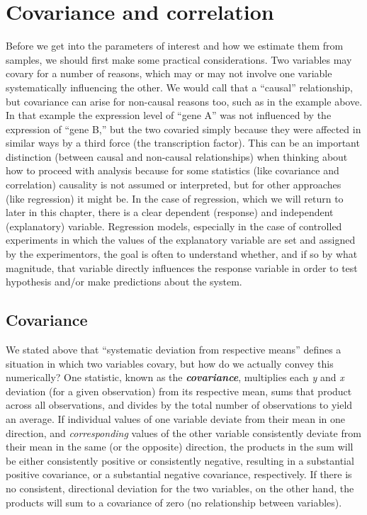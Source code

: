 \documentclass[]{book}
\begin{document}
\hypertarget{covariance-and-correlation}{%
\section{Covariance and correlation}\label{covariance-and-correlation}}

Before we get into the parameters of interest and how we estimate them from samples, we should first make some practical considerations. Two variables may covary for a number of reasons, which may or may not involve one variable systematically influencing the other. We would call that a ``causal'' relationship, but covariance can arise for non-causal reasons too, such as in the example above. In that example the expression level of ``gene A'' was not influenced by the expression of ``gene B,'' but the two covaried simply because they were affected in similar ways by a third force (the transcription factor). This can be an important distinction (between causal and non-causal relationships) when thinking about how to proceed with analysis because for some statistics (like covariance and correlation) causality is not assumed or interpreted, but for other approaches (like regression) it might be. In the case of regression, which we will return to later in this chapter, there is a clear dependent (response) and independent (explanatory) variable. Regression models, especially in the case of controlled experiments in which the values of the explanatory variable are set and assigned by the experimentors, the goal is often to understand whether, and if so by what magnitude, that variable directly influences the response variable in order to test hypothesis and/or make predictions about the system.

\hypertarget{covariance}{%
\subsection{Covariance}\label{covariance}}

We stated above that ``systematic deviation from respective means'' defines a situation in which two variables covary, but how do we actually convey this numerically? One statistic, known as the \textbf{\emph{covariance}}, multiplies each \emph{y} and \emph{x} deviation (for a given observation) from its respective mean, sums that product across all observations, and divides by the total number of observations to yield an average. If individual values of one variable deviate from their mean in one direction, and \emph{corresponding} values of the other variable consistently deviate from their mean in the same (or the opposite) direction, the products in the sum will be either consistently positive or consistently negative, resulting in a substantial positive covariance, or a substantial negative covariance, respectively. If there is no consistent, directional deviation for the two variables, on the other hand, the products will sum to a covariance of zero (no relationship between variables).\\
\end{document}
